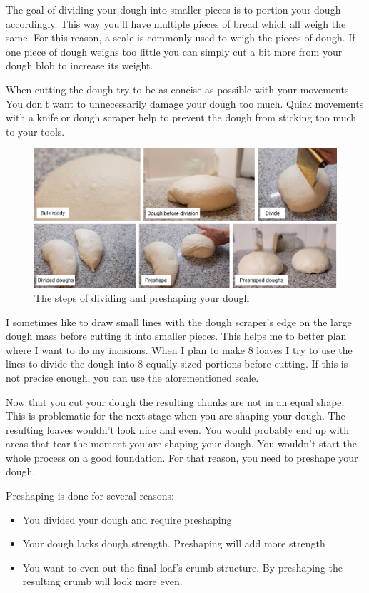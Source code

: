 The goal of dividing your dough into smaller pieces is to portion
your dough accordingly. This way you'll have multiple pieces of bread
which all weigh the same. For this reason, a scale is commonly
used to weigh the pieces of dough. If one piece of dough weighs
too little you can simply cut a bit more from your dough blob
to increase its weight.

When cutting the dough try to be as concise as possible with your
movements. You don't want to unnecessarily damage your dough too much.
Quick movements with a knife or dough scraper help to prevent the
dough from sticking too much to your tools.

\begin{figure}[!htb]
  \includegraphics[width=\textwidth]{divide-preshape}
  \caption{The steps of dividing and preshaping your dough}
\end{figure}

I sometimes like to draw small lines with the dough scraper's edge
on the large dough mass before cutting it into smaller pieces.
This helps me to better plan where I want to do my incisions. When
I plan to make 8 loaves I try to use the lines to divide the dough
into 8 equally sized portions before cutting. If this is not precise enough,
you can use the aforementioned scale.

Now that you cut your dough the resulting chunks are not in an equal shape.
This is problematic for the next stage when you are shaping your dough.
The resulting loaves wouldn't look nice and even. You would probably
end up with areas that tear the moment you are shaping your dough.
You wouldn't start the whole process on a good foundation. For that
reason, you need to preshape your dough.

Preshaping is done for several reasons:
\begin{itemize}
  \item You divided your dough and require preshaping
  \item Your dough lacks dough strength. Preshaping will add more strength
  \item You want to even out the final loaf's crumb structure. By preshaping
  the resulting crumb will look more even.
\end{itemize}

